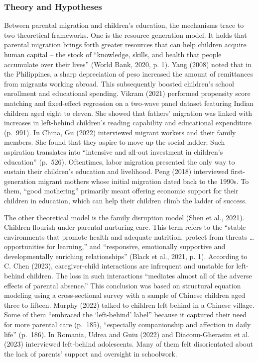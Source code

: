 \documentclass[
  man]{apa7}
\begin{document}
\hypertarget{theory-and-hypotheses}{%
\subsubsection{Theory and Hypotheses}\label{theory-and-hypotheses}}

Between parental migration and children's education, the mechanisms trace to two theoretical frameworks. One is the resource generation model. It holds that parental migration brings forth greater resources that can help children acquire human capital -- the stock of ``knowledge, skills, and health that people accumulate over their lives'' (World Bank, 2020, p. 1). Yang (2008) noted that in the Philippines, a sharp depreciation of peso increased the amount of remittances from migrants working abroad. This subsequently boosted children's school enrollment and educational spending. Vikram (2021) performed propensity score matching and fixed-effect regression on a two-wave panel dataset featuring Indian children aged eight to eleven. She showed that fathers' migration was linked with increases in left-behind children's reading capability and educational expenditure (p.~991). In China, Gu (2022) interviewed migrant workers and their family members. She found that they aspire to move up the social ladder; Such aspiration translates into ``intensive and all-out investment in children's education'' (p.~526). Oftentimes, labor migration presented the only way to sustain their children's education and livelihood. Peng (2018) interviewed first-generation migrant mothers whose initial migration dated back to the 1990s. To them, ``good mothering'' primarily meant offering economic support for their children in education, which can help their children climb the ladder of success.

The other theoretical model is the family disruption model (Shen et al., 2021). Children flourish under parental nurturing care. This term refers to the ``stable environments that promote health and adequate nutrition, protect from threats \ldots{} opportunities for learning,'' and ``responsive, emotionally supportive and developmentally enriching relationships'' (Black et al., 2021, p. 1). According to C. Chen (2023), caregiver-child interactions are infrequent and unstable for left-behind children. The loss in such interactions ``mediates almost all of the adverse effects of parental absence.'' This conclusion was based on structural equation modeling using a cross-sectional survey with a sample of Chinese children aged three to fifteen. Murphy (2022) talked to children left behind in a Chinese village. Some of them ``embraced the `left-behind' label'' because it captured their need for more parental care (p.~185), ``especially companionship and affection in daily life'' (p.~186). In Romania, Udrea and Guiu (2022) and Diaconu-Gherasim et al. (2023) interviewed left-behind adolescents. Many of them felt disorientated about the lack of parents' support and oversight in schoolwork.
\end{document}
